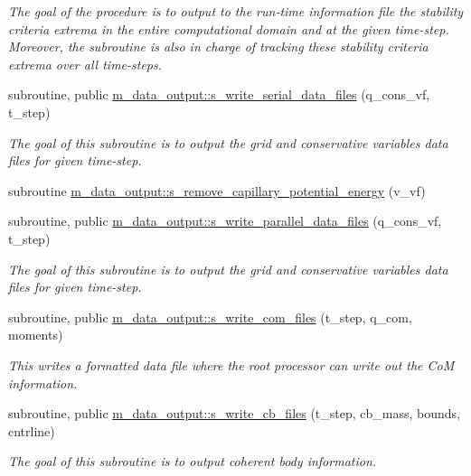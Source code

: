 \begin{DoxyCompactItemize}
\begin{DoxyCompactList}\small\item\em The goal of the procedure is to output to the run-\/time information file the stability criteria extrema in the entire computational domain and at the given time-\/step. Moreover, the subroutine is also in charge of tracking these stability criteria extrema over all time-\/steps. \end{DoxyCompactList}\item 
subroutine, public \hyperlink{namespacem__data__output_a04c6b0f01b8561e248a740b017fc4f7d}{m\+\_\+data\+\_\+output\+::s\+\_\+write\+\_\+serial\+\_\+data\+\_\+files} (q\+\_\+cons\+\_\+vf, t\+\_\+step)
\begin{DoxyCompactList}\small\item\em The goal of this subroutine is to output the grid and conservative variables data files for given time-\/step. \end{DoxyCompactList}\item 
subroutine \hyperlink{namespacem__data__output_a178b41597f79f2c0a42c0d6e65275b71}{m\+\_\+data\+\_\+output\+::s\+\_\+remove\+\_\+capillary\+\_\+potential\+\_\+energy} (v\+\_\+vf)
\item 
subroutine, public \hyperlink{namespacem__data__output_a9c1271b2c588c1ae3275791d41550f75}{m\+\_\+data\+\_\+output\+::s\+\_\+write\+\_\+parallel\+\_\+data\+\_\+files} (q\+\_\+cons\+\_\+vf, t\+\_\+step)
\begin{DoxyCompactList}\small\item\em The goal of this subroutine is to output the grid and conservative variables data files for given time-\/step. \end{DoxyCompactList}\item 
subroutine, public \hyperlink{namespacem__data__output_a6be3381410dd028014de2c1d02b05139}{m\+\_\+data\+\_\+output\+::s\+\_\+write\+\_\+com\+\_\+files} (t\+\_\+step, q\+\_\+com, moments)
\begin{DoxyCompactList}\small\item\em This writes a formatted data file where the root processor can write out the CoM information. \end{DoxyCompactList}\item 
subroutine, public \hyperlink{namespacem__data__output_a40724c992117a24479573d9fbcdfa21b}{m\+\_\+data\+\_\+output\+::s\+\_\+write\+\_\+cb\+\_\+files} (t\+\_\+step, cb\+\_\+mass, bounds, cntrline)
\begin{DoxyCompactList}\small\item\em The goal of this subroutine is to output coherent body information. \end{DoxyCompactList}\item 

\end{DoxyCompactItemize}
